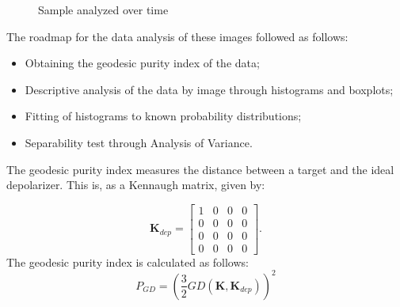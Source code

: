\documentclass[12pt]{article}
\begin{document}
\begin{figure}[hbt]
  \centering
  \caption{Sample analyzed over time}
  \label{fig:sample_images}
\end{figure}

The roadmap for the data analysis of these images followed as follows:
\begin{itemize}
  \item Obtaining the geodesic purity index of the data;
  \item Descriptive analysis of the data by image through histograms and boxplots;
  \item Fitting of histograms to known probability distributions;
  \item Separability test through Analysis of Variance.
\end{itemize}

The geodesic purity index measures the distance between a target and the ideal depolarizer. This is, as a Kennaugh matrix, given by:

{
\[ \mathbf{K}_{dep} =
\begin{bmatrix}
1 & 0 & 0 & 0\\
0 & 0 & 0 & 0\\
0 & 0 & 0 & 0\\
0 & 0 & 0 & 0
\end{bmatrix}.
\]
}
The geodesic purity index is calculated as follows:
\begin{equation}
  P_{GD} = \left(\frac{3}{2}GD(\mathbf{K}, \mathbf{K}_{dep})\right)^2
\end{equation}
\end{document}

